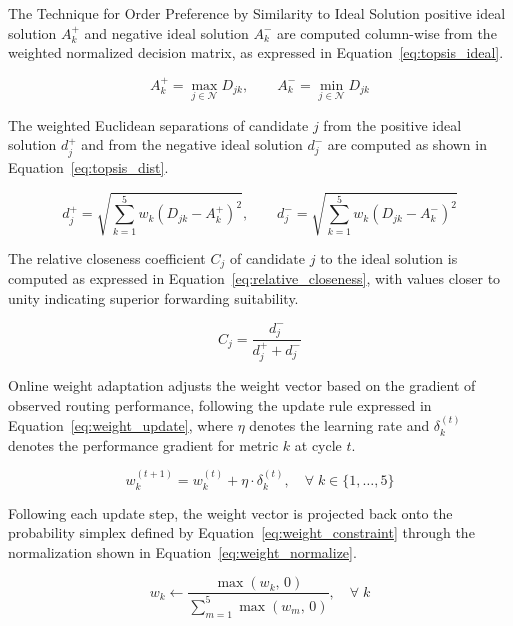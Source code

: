 \documentclass[a4paper,fleqn]{cas-dc}
\numberwithin{equation}{section}
\begin{document}
The Technique for Order Preference by Similarity to Ideal Solution
positive ideal solution $A_k^{+}$ and negative ideal solution
$A_k^{-}$ are computed column-wise from the weighted normalized
decision matrix, as expressed in Equation~\ref{eq:topsis_ideal}.

\begin{equation}
\label{eq:topsis_ideal}
A_k^{+} = \max_{j \in \mathcal{N}} D_{jk},
\qquad
A_k^{-} = \min_{j \in \mathcal{N}} D_{jk}
\end{equation}

The weighted Euclidean separations of candidate $j$ from the positive
ideal solution $d_j^{+}$ and from the negative ideal solution
$d_j^{-}$ are computed as shown in Equation~\ref{eq:topsis_dist}.

\begin{equation}
\label{eq:topsis_dist}
d_j^{+} = \sqrt{\sum_{k=1}^{5} w_k \left(D_{jk} - A_k^{+}\right)^2},
\qquad
d_j^{-} = \sqrt{\sum_{k=1}^{5} w_k \left(D_{jk} - A_k^{-}\right)^2}
\end{equation}

The relative closeness coefficient $C_j$ of candidate $j$ to the
ideal solution is computed as expressed in
Equation~\ref{eq:relative_closeness}, with values closer to unity
indicating superior forwarding suitability.

\begin{equation}
\label{eq:relative_closeness}
C_j = \frac{d_j^{-}}{d_j^{+} + d_j^{-}}
\end{equation}

Online weight adaptation adjusts the weight vector based on the
gradient of observed routing performance, following the update rule
expressed in Equation~\ref{eq:weight_update}, where $\eta$ denotes
the learning rate and $\delta_k^{(t)}$ denotes the performance
gradient for metric $k$ at cycle $t$.

\begin{equation}
\label{eq:weight_update}
w_k^{(t+1)} = w_k^{(t)} + \eta \cdot \delta_k^{(t)},
\quad \forall \; k \in \{1,\ldots,5\}
\end{equation}

Following each update step, the weight vector is projected back onto
the probability simplex defined by Equation~\ref{eq:weight_constraint}
through the normalization shown in Equation~\ref{eq:weight_normalize}.

\begin{equation}
\label{eq:weight_normalize}
w_k \leftarrow \frac{\max(w_k,\, 0)}
{\displaystyle\sum_{m=1}^{5} \max(w_m,\, 0)},
\quad \forall \; k
\end{equation}
\end{document}
